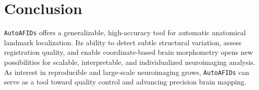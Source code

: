 \section{Conclusion}

\texttt{AutoAFIDs} offers a generalizable, high-accuracy tool for automatic anatomical landmark localization. Its ability to detect subtle structural variation, assess registration quality, and enable coordinate-based brain morphometry opens new possibilities for scalable, interpretable, and individualized neuroimaging analysis. As interest in reproducible and large-scale neuroimaging grows, \texttt{AutoAFIDs} can serve as a tool toward quality control and advancing precision brain mapping.



